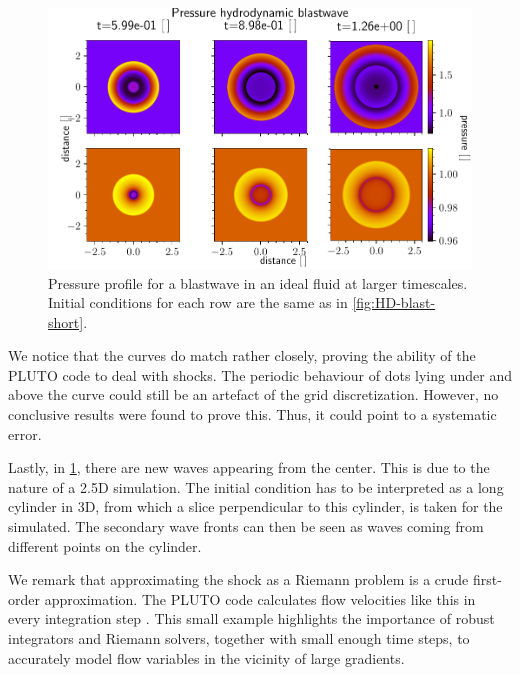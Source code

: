 \begin{figure}[H]
	\centering
	\includegraphics[width=\linewidth]{images/HD-blast-prs-2.pdf}
	\caption{Pressure profile for a blastwave in an ideal fluid at larger timescales. Initial conditions for each row are the same as in \cref{fig:HD-blast-short}.}
	\label{fig:HD-blast-long}
\end{figure}

We notice that the curves do match rather closely, proving the ability of the PLUTO code to deal with shocks. 
The periodic behaviour of dots lying under and above the curve could still be an artefact of the grid discretization. However, no conclusive results were found to prove this. Thus, it could point to a systematic error.

Lastly, in \cref{fig:HD-blast-long}, there are new waves appearing from the center. This is due to the nature of a 2.5D simulation.
The initial condition has to be interpreted as a long cylinder in 3D, from which a slice perpendicular to this cylinder, is taken for the simulated. 
The secondary wave fronts can then be seen as waves coming from different points on the cylinder.

We remark that approximating the shock as a Riemann problem is a crude first-order approximation. 
The PLUTO code calculates flow velocities like this in every integration step \cite{pluto-paper}. 
This small example highlights the importance of robust integrators and Riemann solvers, together with small enough time steps, to accurately model flow variables in the vicinity of large gradients.


